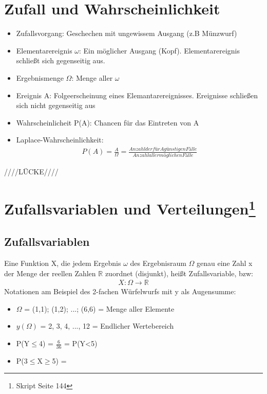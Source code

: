\documentclass[a4paper,10pt]{scrartcl}
\begin{document}
\section{Zufall und Wahrscheinlichkeit}
\begin{itemize}
    \item Zufallsvorgang: Geschechen mit ungewissem Ausgang (z.B Münzwurf)
    \item Elementarereignis $\omega$: Ein möglicher Ausgang (Kopf). Elementarereignis schließt sich gegenseitig aus.
    \item Ergebnismenge $\Omega$: Menge aller $\omega$
    \item Ereignis A: Folgeerscheinung eines Elemantarereignisses. 
    Ereignisse schließen sich nicht gegenseitig aus
    \item Wahrscheinlicheit P(A): Chancen für das Eintreten von A
    \item Laplace-Wahrscheinlichkeit:
    \begin{align*}
    P(A) = \frac{A}{\Omega} = 
    \frac{Anzahl der für A günstigen Fälle}{Anzahl aller möglichen Fälle}
    \end{align*}
\end{itemize}



////LÜCKE////



\section[Zufallsvariablen und Verteilungen]{Zufallsvariablen und Verteilungen\footnote{Skript Seite 144}}
\subsection{Zufallsvariablen}
Eine Funktion X, die jedem Ergebnis $\omega$ des Ergebnisraum $\Omega$ genau eine Zahl x der Menge der reellen Zahlen $\mathbb{R}$
zuordnet (disjunkt), heißt Zufallsvariable, bzw:
\begin{eqnarray*}
X: \Omega \rightarrow \mathbb{R}
\end{eqnarray*}
Notationen am Beispiel des 2-fachen Würfelwurfs mit y als Augensumme:
\begin{itemize}
    \item $\Omega$ = {(1,1); (1,2); ...; (6,6)} = Menge aller Elemente
    \item $y(\Omega)$ = {2, 3, 4, ..., 12} = Endlicher Wertebereich
    \item P(Y$\leq$4) = $\frac{6}{36}$ = P(Y<5)
    \item P(3$\leq$X$\geq$5) = 
\end{itemize}
\end{document}
